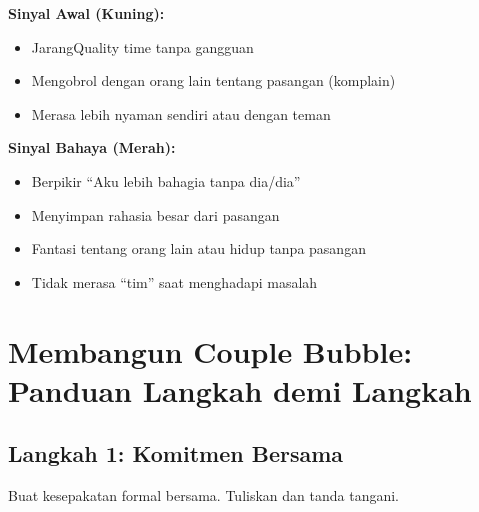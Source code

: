 \begin{praktikbox}
\textbf{Sinyal Awal (Kuning):}
\begin{itemize}
    \item JarangQuality time tanpa gangguan
    \item Mengobrol dengan orang lain tentang pasangan (komplain)
    \item Merasa lebih nyaman sendiri atau dengan teman
\end{itemize}

\textbf{Sinyal Bahaya (Merah):}
\begin{itemize}
    \item Berpikir ``Aku lebih bahagia tanpa dia/dia''
    \item Menyimpan rahasia besar dari pasangan
    \item Fantasi tentang orang lain atau hidup tanpa pasangan
    \item Tidak merasa ``tim'' saat menghadapi masalah
\end{itemize}
\end{praktikbox}

\section{Membangun Couple Bubble: Panduan Langkah demi Langkah}

\subsection{Langkah 1: Komitmen Bersama}

Buat kesepakatan formal bersama. Tuliskan dan tanda tangani.

